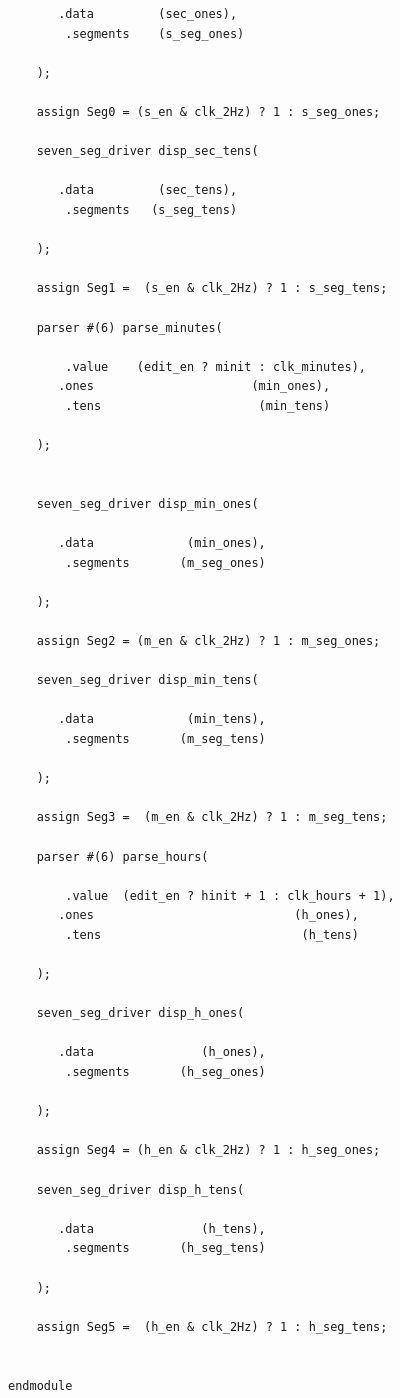 \documentclass[a4paper]{article}
\begin{document}
\begin{Verbatim}
	   .data         (sec_ones),
		.segments    (s_seg_ones)
	
	);
	
	assign Seg0 = (s_en & clk_2Hz) ? 1 : s_seg_ones; 
	
	seven_seg_driver disp_sec_tens(
	
	   .data         (sec_tens),
		.segments   (s_seg_tens)
	
	);
	
	assign Seg1 =  (s_en & clk_2Hz) ? 1 : s_seg_tens;  
	
	parser #(6) parse_minutes(
	   
		.value    (edit_en ? minit : clk_minutes),
	   .ones                      (min_ones),
		.tens                      (min_tens)
	
	);
	
	
	seven_seg_driver disp_min_ones(
	
	   .data             (min_ones),
		.segments       (m_seg_ones)
	
	);
	
	assign Seg2 = (m_en & clk_2Hz) ? 1 : m_seg_ones; 
	
	seven_seg_driver disp_min_tens(
	
	   .data             (min_tens),
		.segments       (m_seg_tens)
	
	);
	
	assign Seg3 =  (m_en & clk_2Hz) ? 1 : m_seg_tens; 
	
	parser #(6) parse_hours(
	   
		.value  (edit_en ? hinit + 1 : clk_hours + 1),
	   .ones                            (h_ones),
		.tens                            (h_tens)
	
	);
	
	seven_seg_driver disp_h_ones(
	
	   .data               (h_ones),
		.segments       (h_seg_ones)
	
	);
	
	assign Seg4 = (h_en & clk_2Hz) ? 1 : h_seg_ones; 
	
	seven_seg_driver disp_h_tens(
	
	   .data               (h_tens),
		.segments       (h_seg_tens)
	
	);
	
	assign Seg5 =  (h_en & clk_2Hz) ? 1 : h_seg_tens; 
	 

endmodule 
\end{Verbatim}
\end{document}
